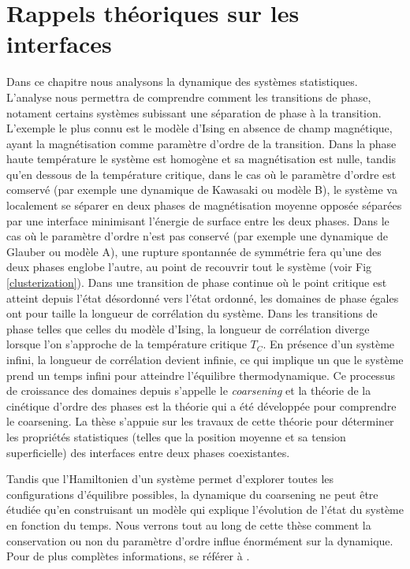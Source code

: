 \chapter{Rappels théoriques sur les interfaces}
 
Dans ce chapitre nous analysons la dynamique des systèmes statistiques. L'analyse nous permettra de comprendre comment les transitions de phase, notament certains systèmes subissant une séparation de phase à la transition. L'exemple le plus connu est le modèle d'Ising en absence de champ magnétique, ayant la magnétisation comme paramètre d'ordre de la transition. Dans la phase haute température le système est homogène et sa magnétisation est nulle, tandis qu'en dessous de la température critique, dans le cas où le paramètre d'ordre est comservé (par exemple une dynamique de Kawasaki ou modèle B), le système va localement se séparer en deux phases de magnétisation moyenne opposée séparées par une interface minimisant l'énergie de surface entre les deux phases. 
Dans le cas où le paramètre d'ordre n'est pas conservé (par exemple une dynamique de Glauber ou modèle A), une rupture spontannée de symmétrie fera qu'une des deux phases englobe l'autre, au point de recouvrir tout le système (voir Fig \ref{clusterization}). Dans une transition de phase continue où le point critique est atteint depuis l'état désordonné vers l'état ordonné, les domaines de phase égales ont pour taille la longueur de corrélation du système. Dans les transitions de phase telles que celles du modèle d'Ising, la longueur de corrélation diverge lorsque l'on s'approche de la température critique $T_C$. En présence d'un système infini, la longueur de corrélation devient infinie, ce qui implique un que le système prend un temps infini pour atteindre l'équilibre thermodynamique. Ce processus de croissance des domaines depuis s'appelle le \textit{coarsening} et la théorie de la cinétique d'ordre des phases est la théorie qui a été développée pour comprendre le coarsening. 
La thèse s'appuie sur les travaux de cette théorie pour déterminer les propriétés statistiques (telles que la position moyenne et sa tension superficielle) des interfaces entre deux phases coexistantes.

Tandis que l'Hamiltonien d'un système permet d'explorer toutes les configurations d'équilibre possibles, la dynamique du coarsening ne peut être étudiée qu'en construisant un modèle qui explique l'évolution de l'état du système en fonction du temps. Nous verrons tout au long de cette thèse comment la conservation ou non du paramètre d'ordre influe énormément sur la dynamique. Pour de plus complètes informations, se référer à \cite{hohenberg_theory_1977,bray_theory_1994,krapivsky_kinetic_2010,halpin-healy_kinetic_1995}.

